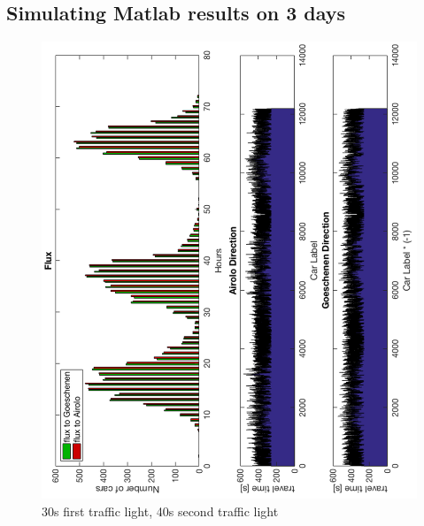 \documentclass[11pt,a4paper,parskip=half-]{article}
\begin{document}
\subsection{Simulating Matlab results on 3 days}


\vspace{-6.5mm}

\begin{figure}[h!]
\includegraphics[scale=0.80]{30_40_3g}
\centering
\vspace*{-4mm}
\caption{30s first traffic light, 40s second traffic light}
\label{fig:30_40_3g}
\end{figure}
\end{document}
